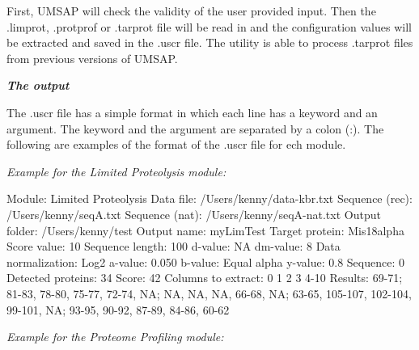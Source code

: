First, UMSAP will check the validity of the user provided input. Then the .limprot, .protprof or .tarprot file will be read in and the configuration values will be extracted and saved in the .uscr file. The utility is able to process .tarprot files from previous versions of UMSAP.

\textit{\textbf{The output}}

The .uscr file has a simple format in which each line has a keyword and an argument. The keyword and the argument are separated by a colon (:). The following are examples of the format of the .uscr file for ech module.\newline

\textit{Example for the Limited Proteolysis module:}

Module: Limited Proteolysis\newline
Data file: /Users/kenny/data-kbr.txt\newline
Sequence (rec): /Users/kenny/seqA.txt\newline
Sequence (nat): /Users/kenny/seqA-nat.txt\newline
Output folder: /Users/kenny/test\newline
Output name: myLimTest\newline
Target protein: Mis18alpha\newline
Score value: 10\newline
Sequence length: 100\newline
d-value: NA\newline
dm-value: 8\newline
Data normalization: Log2\newline
a-value: 0.050\newline
b-value: Equal alpha\newline
y-value: 0.8\newline
Sequence: 0\newline
Detected proteins: 34\newline
Score: 42\newline
Columns to extract: 0 1 2 3 4-10\newline
Results: 69-71; 81-83, 78-80, 75-77, 72-74, NA; NA, NA, NA, 66-68, NA; 63-65, 105-107, 102-104, 99-101, NA; 93-95, 90-92, 87-89, 84-86, 60-62\newline

\textit{Example for the Proteome Profiling module:}


